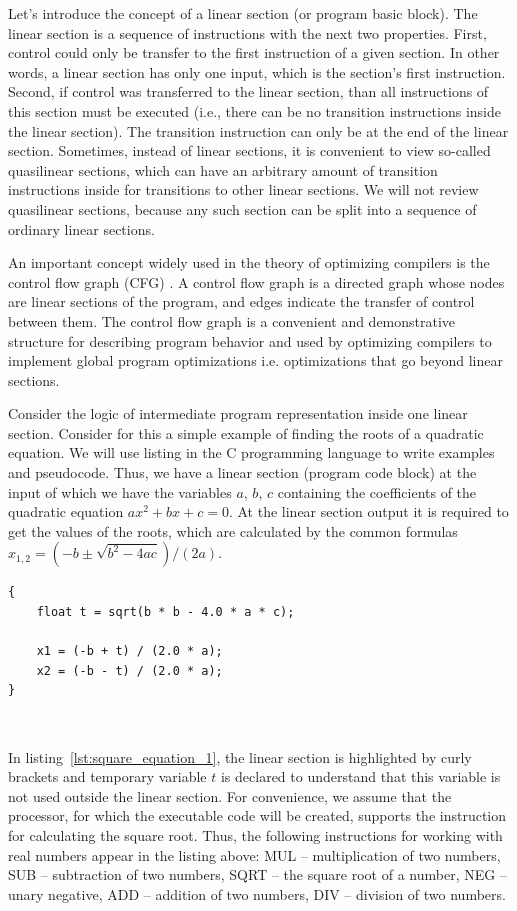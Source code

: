 \documentclass[
11pt,%
tightenlines,%
twoside,%
onecolumn,%
nofloats,%
nobibnotes,%
nofootinbib,%
superscriptaddress,%
noshowpacs,%
centertags]%
{revtex4}
\begin{document}
Let's introduce the concept of a linear section (or program basic block).
The linear section is a sequence of instructions with the next two properties.
First, control could only be transfer to the first instruction of a given section.
In other words, a linear section has only one input, which is the section's first  instruction.
Second, if control was transferred to the linear section, than all instructions of this section must be executed (i.e., there can be no transition instructions inside the linear section).
The transition instruction can only be at the end of the linear section.
Sometimes, instead of linear sections, it is convenient to view so-called quasilinear sections, which can have an arbitrary amount of transition instructions inside for transitions to other linear sections.
We will not review quasilinear sections, because any such section can be split into a sequence of ordinary linear sections.

An important concept widely used in the theory of optimizing compilers is the control flow graph (CFG) \cite{Muchnick}.
A control flow graph is a directed graph whose nodes are linear sections of the program, and edges indicate the transfer of control between them.
The control flow graph is a convenient and demonstrative structure for describing program behavior and used by optimizing compilers to implement global program optimizations i.e. optimizations that go beyond linear sections.

Consider the logic of intermediate program representation inside one linear section.
Consider for this a simple example of finding the roots of a quadratic equation.
We will use listing in the C programming language to write examples and pseudocode.
Thus, we have a linear section (program code block) at the input of which we have the variables $a$, $b$, $c$ containing the coefficients of the quadratic equation $ax^2 + bx + c = 0$.
At the linear section output it is required to get the values of the roots, which are calculated by the common formulas $x_{1,2} = (-b \pm \sqrt{b^2 - 4ac})/(2a)$.

\begin{lstlisting}[caption={The code block for calculating the roots of quadratic equation.},label={lst:square_equation_1}]
{
    float t = sqrt(b * b - 4.0 * a * c);
    
    x1 = (-b + t) / (2.0 * a);
    x2 = (-b - t) / (2.0 * a);
}
\end{lstlisting}

\

In listing~\ref{lst:square_equation_1}, the linear section is highlighted by curly brackets and temporary variable $t$ is declared to understand that this variable is not used outside the linear section.
For convenience, we assume that the processor, for which the executable code will be created, supports the instruction for calculating the square root.
Thus, the following instructions for working with real numbers appear in the listing above: MUL -- multiplication of two numbers, SUB -- subtraction of two numbers, SQRT -- the square root of a number, NEG -- unary negative, ADD -- addition of two numbers, DIV -- division of two numbers.
\end{document}
